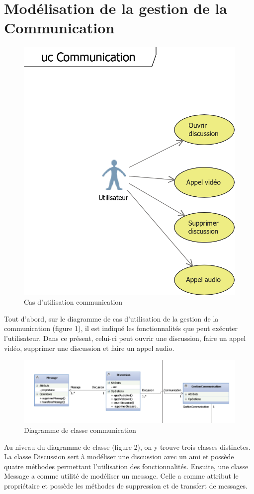 \documentclass[11pt]{article}
\begin{document}
\section{Modélisation de la gestion de la Communication}
\begin{figure}[!h]
        \centering \includegraphics[scale=1]{ucCom.png}
        \caption{Cas d'utilisation communication}
         \label{fig:ucCom}
\end{figure}
Tout d’abord, sur le diagramme de cas d’utilisation de la gestion de la communication (figure 1), il est indiqué les fonctionnalités que peut exécuter l’utilisateur. Dans ce présent, celui-ci peut ouvrir une discussion, faire un appel vidéo, supprimer une discussion et faire un appel audio. 
\begin{figure}[!h]
        \centering \includegraphics[scale=1]{com.png}
        \caption{Diagramme de classe communication}
         \label{fig:com}
\end{figure}
Au niveau du diagramme de classe (figure 2), on y trouve trois classes distinctes. La classe Discussion sert à modéliser une discussion avec un ami et possède quatre méthodes permettant l’utilisation des fonctionnalités. Ensuite, une classe Message a comme utilité de modéliser un message. Celle a comme attribut le propriétaire et possède les méthodes de suppression et de transfert de messages.
\end{document}
